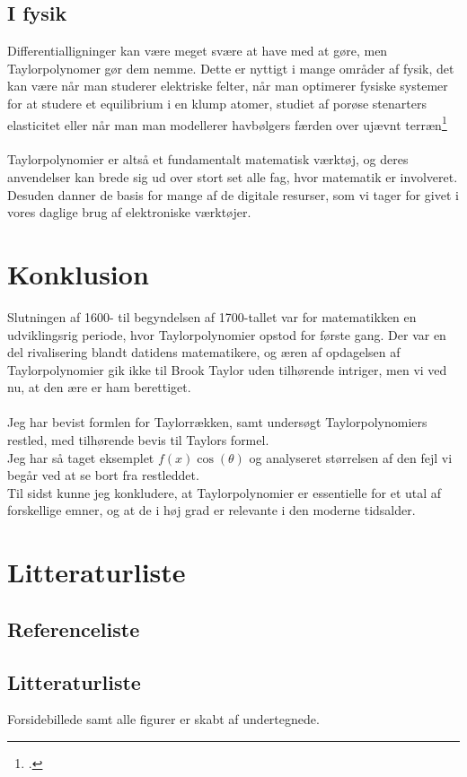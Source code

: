 \documentclass[12pt, a4paper]{article}
\begin{document}
\begin{refsection}
\subsection{I fysik}
Differentialligninger kan være meget svære at have med at gøre, men Taylorpolynomer gør dem nemme. Dette er nyttigt i mange områder af fysik, det kan være når man studerer elektriske felter, når man optimerer fysiske systemer for at studere et equilibrium i en klump atomer, studiet af porøse stenarters elasticitet eller når man man modellerer havbølgers færden over ujævnt terræn\footcite{applicationsoftaylor}\\
\\
Taylorpolynomier er altså et fundamentalt matematisk værktøj, og deres anvendelser kan brede sig ud over stort set alle fag, hvor matematik er involveret. Desuden danner de basis for mange af de digitale resurser, som vi tager for givet i vores daglige brug af elektroniske værktøjer.

\section{Konklusion} %
Slutningen af 1600- til begyndelsen af 1700-tallet var for matematikken en udviklingsrig periode, hvor Taylorpolynomier opstod for første gang. Der var en del rivalisering blandt datidens matematikere, og æren af opdagelsen af Taylorpolynomier gik ikke til Brook Taylor uden tilhørende intriger, men vi ved nu, at den ære er ham berettiget.\\
\\
Jeg har bevist formlen for Taylorrækken, samt undersøgt Taylorpolynomiers restled, med tilhørende bevis til Taylors formel.\\
Jeg har så taget eksemplet $f(x)\cos{(\theta)}$ og analyseret størrelsen af den fejl vi begår ved at se bort fra restleddet.\\
Til sidst kunne jeg konkludere, at Taylorpolynomier er essentielle for et utal af forskellige emner, og at de i høj grad er relevante i den moderne tidsalder.
\section{Litteraturliste}
\subsection{Referenceliste}
\printbibliography[title=Cited]
\end{refsection}
\subsection{Litteraturliste}
\nocite{*}
\printbibliography
Forsidebillede samt alle figurer er skabt af undertegnede.
\end{document}
